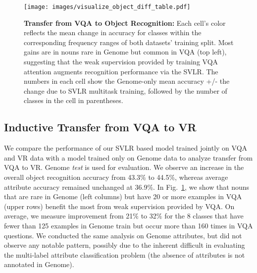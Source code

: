 \begin{figure}
\vspace{-2mm}
\texttt{[image: images/visualize\_object\_diff\_table.pdf]}
\vspace{-4mm}
\caption{\textbf{Transfer from VQA to Object Recognition:} Each cell's color reflects the mean change in accuracy for classes within the corresponding frequency ranges of both datasets' training split. Most gains are in nouns rare in Genome but common in VQA (top left), suggesting that the weak supervision provided by training VQA attention augments recognition performance via the SVLR. The numbers in each cell show the Genome-only mean accuracy +/- the change due to SVLR multitask training, followed by the number of classes in the cell in parentheses.}
\vspace{-2mm}
\label{fig:obj_change}
\end{figure}






\subsection{Inductive Transfer from VQA to VR}\label{sec:vqa2vr}
We compare the performance of our SVLR based model trained jointly on VQA and VR data with a model trained only on Genome data to analyze transfer from VQA to VR. Genome \textit{test} is used for evaluation. We observe an increase in the overall object recognition accuracy from 43.3\% to 44.5\%, whereas average attribute accuracy remained unchanged at 36.9\%. In Fig.~\ref{fig:obj_change}, we show that nouns that are rare in Genome (left columns) but have 20 or more examples in VQA (upper rows) benefit the most from weak supervision provided by VQA.  On average, we measure improvement from 21$\%$ to 32$\%$ for the 8 classes that have fewer than 125 examples in Genome train but occur more than 160 times in VQA questions. We conducted the same analysis on Genome attributes, but did not observe any notable pattern, possibly due to the inherent difficult in evaluating the multi-label attribute classification problem (the absence of attributes is not annotated in Genome).

